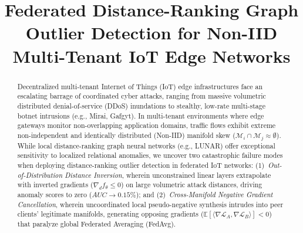 \documentclass[conference]{IEEEtran}
\begin{document}
\title{Federated Distance-Ranking Graph Outlier Detection for Non-IID Multi-Tenant IoT Edge Networks}

\author{
}

\maketitle

\begin{abstract}
Decentralized multi-tenant Internet of Things (IoT) edge infrastructures face an escalating barrage of coordinated cyber attacks, ranging from massive volumetric distributed denial-of-service (DDoS) inundations to stealthy, low-rate multi-stage botnet intrusions (e.g., Mirai, Gafgyt). In multi-tenant environments where edge gateways monitor non-overlapping application domains, traffic flows exhibit extreme non-independent and identically distributed (Non-IID) manifold skew ($\mathcal{M}_i \cap \mathcal{M}_j \approx \emptyset$). While local distance-ranking graph neural networks (e.g., LUNAR) offer exceptional sensitivity to localized relational anomalies, we uncover two catastrophic failure modes when deploying distance-ranking outlier detection in federated IoT networks: (1)~\emph{Out-of-Distribution Distance Inversion}, wherein unconstrained linear layers extrapolate with inverted gradients ($\nabla_d f_\theta \le 0$) on large volumetric attack distances, driving anomaly scores to zero ($AUC \to 0.15\%$); and (2)~\emph{Cross-Manifold Negative Gradient Cancellation}, wherein uncoordinated local pseudo-negative synthesis intrudes into peer clients' legitimate manifolds, generating opposing gradients ($\mathbb{E}[\langle \nabla \mathcal{L}_A, \nabla \mathcal{L}_B \rangle] < 0$) that paralyze global Federated Averaging (FedAvg).


\end{abstract}
\end{document}
